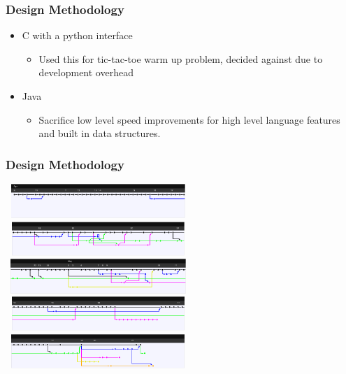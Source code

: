 \documentclass[10pt]{beamer}
\newcommand{\bcen}{\begin{center}}
\newcommand{\ecen}{\end{center}}
\begin{document}
\begin{frame}
\frametitle{Design Methodology}
  \bcen
  \begin{itemize}
  \item<1-> C with a python interface
      \begin{itemize}
        \item<1-> Used this for tic-tac-toe warm up problem, decided against due to development overhead 
      \end{itemize}
  \item<2-> Java
      \begin{itemize}
        \item<2->  Sacrifice low level speed improvements for high level language features and built in data structures.
      \end{itemize}
  \end{itemize}
  \ecen
\end{frame}

\begin{frame}
\frametitle{Design Methodology}
  \bcen
  \includegraphics[height=1.3cm,width=7cm]{line1}\\
  \includegraphics[height=1.3cm,width=7cm]{line2}\\
  \includegraphics[height=1.3cm,width=7cm]{line3}\\
  \includegraphics[height=1.3cm,width=7cm]{line4}\\
  \includegraphics[height=1.3cm,width=7cm]{line5}
  \ecen
\end{frame}
\end{document}
